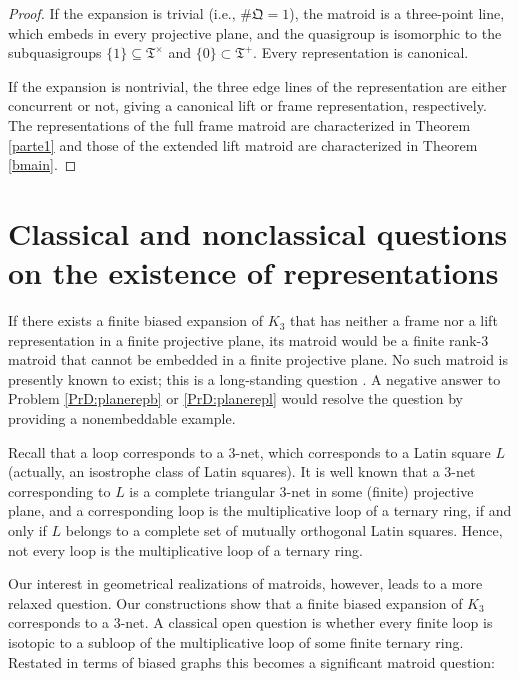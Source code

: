 \documentclass[reqno,12pt]{amsart}
\theoremstyle{remark}
\numberwithin{equation}{section}
\numberwithin{figure}{section}
\newcommand \fQ{\mathfrak Q}
\newcommand \fT{\mathfrak T}
\begin{document}
\begin{proof}
If the expansion is trivial (i.e., $\#\fQ=1$), the matroid is a three-point line, which embeds in every projective plane, and the quasigroup is isomorphic to the subquasigroups $\{1\} \subseteq \fT^\times$ and $\{0\} \subset \fT^+$.  Every representation is canonical.

If the expansion is nontrivial, the three edge lines of the representation are either concurrent or not, giving a canonical lift or frame representation, respectively.  
The representations of the full frame matroid are characterized in Theorem \ref{parte1} and those of the extended lift matroid are characterized in Theorem \ref{bmain}.
\end{proof}



\section{Classical and nonclassical questions on the existence of representations}
\label{questions}

If there exists a finite biased expansion of $K_3$ that has neither a frame nor a lift representation in a finite projective plane, its matroid would be a finite rank-3 matroid that cannot be embedded in a finite projective plane.  No such matroid is presently known to exist; this is a long-standing question \cite[Problem 14.8.1]{Oxley}.
A negative answer to Problem \ref{PrD:planerepb} or \ref{PrD:planerepl} would resolve the question by providing a nonembeddable example.  

Recall that a loop corresponds to a $3$-net, which corresponds to a Latin square $L$ (actually, an isostrophe class of Latin squares).  
It is well known that a $3$-net corresponding to $L$ is a complete triangular $3$-net in some (finite) projective plane, and a corresponding loop is the multiplicative loop of a ternary ring, if and only if $L$ belongs to a complete set of mutually orthogonal Latin squares.  
Hence, not every loop is the multiplicative loop of a ternary ring.  

Our interest in geometrical realizations of matroids, however, leads to a more relaxed question.  Our constructions show that a finite biased expansion of $K_3$ corresponds to a $3$-net.  
A classical open question is whether every finite loop is isotopic to a subloop of the multiplicative loop of some finite ternary ring.  Restated in terms of biased graphs this becomes a significant matroid question:
\end{document}
